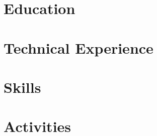 \documentclass[letter,10pt]{article}
\begin{document}


\section{Education}


\section{Technical Experience}


\section{Skills}



\section{Activities}

\end{document}
